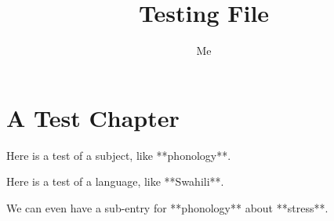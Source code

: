 \documentclass{langscibook}
\begin{document}
\frontmatter
\title{Testing File}
\author{Me}
\maketitle
\tableofcontents

\mainmatter
\chapter{A Test Chapter}

Here is a test of a subject, like **phonology**.

Here is a test of a language, like **Swahili**.

We can even have a sub-entry for **phonology** about **stress**.

\backmatter
\printindex[sbj]
\printindex[lan]
\end{document}
